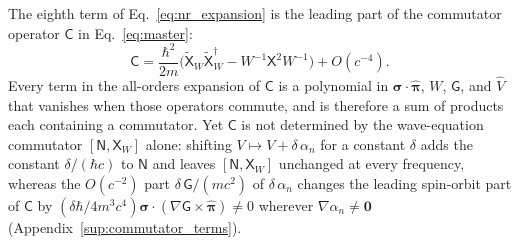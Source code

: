 \documentclass[aps,prd,onecolumn,tightenlines,nofootinbib,notitlepage,11pt,floatfix]{revtex4-2}
\theoremstyle{indentedtheorem}
\begin{document}
The eighth term of Eq.~\eqref{eq:nr_expansion} is the leading part of the commutator operator $\mathsf{C}$ in Eq.~\eqref{eq:master}:
\begin{equation}
    \mathsf{C} = \frac{\hbar^2}{2m}\big(\tilde{\mathsf{X}}_W\tilde{\mathsf{X}}_W^\dagger - W^{-1}\mathsf{X}^2 W^{-1}\big) + O(c^{-4}) .
    \label{eq:commutator_term}
\end{equation}
Every term in the all-orders expansion of $\mathsf{C}$ is a polynomial in $\boldsymbol{\sigma}\cdot\hat{\boldsymbol{\pi}}$, $W$, $\mathsf{G}$, and $\hat{V}$ that vanishes when those operators commute, and is therefore a sum of products each containing a commutator. Yet $\mathsf{C}$ is not determined by the wave-equation commutator $[\mathsf{N},\mathsf{X}_W]$ alone: shifting $V \mapsto V + \delta\,\alpha_n$ for a constant $\delta$ adds the constant $\delta/(\hbar c)$ to $\mathsf{N}$ and leaves $[\mathsf{N},\mathsf{X}_W]$ unchanged at every frequency, whereas the $O(c^{-2})$ part $\delta\,\mathsf{G}/(mc^2)$ of $\delta\,\alpha_n$ changes the leading spin-orbit part of $\mathsf{C}$ by $(\delta\hbar/4m^3c^4)\boldsymbol{\sigma}\cdot(\nabla\mathsf{G}\times\hat{\boldsymbol{\pi}})\neq 0$ wherever $\nabla\alpha_n\neq\mathbf{0}$ (Appendix~\ref{sup:commutator_terms}).
\end{document}
